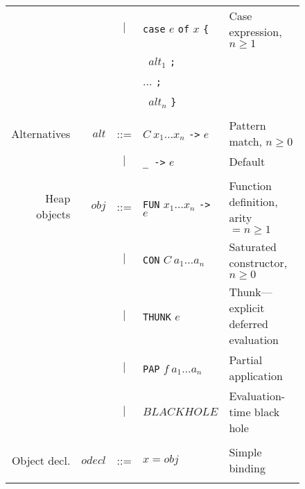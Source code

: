 \documentclass{llncs}
\begin{document}
\begin{figure}
\begin{tabular}{r r c l l}
             &                & $|$ & \texttt{case} $e$ \texttt{of} $x$ \texttt{\{}  & Case expression, $n \ge 1$\\
             &                &     & \texttt{ } $\mathit{alt}_1$ \texttt{;} \\
             &                &     & \hspace{0.2in} $\dots$ \texttt{;} \\
             &                &     & \texttt{ } $\mathit{alt}_n$ \texttt{\}} \\
\\
Alternatives & $\mathit{alt}$ & ::= & $C\ x_1\dots x_n$ \texttt{->} $e$            & Pattern match, $n \ge 0$ \\
             &                & $|$ & \texttt{\_ ->} $e$                           & Default \\
\\
Heap objects & $\mathit{obj}$ & ::= &\texttt{FUN} $x_1\dots x_n$ \texttt{->} $e$   & Function definition, arity $=n\ge 1$ \\
             &                & $|$ &\texttt{CON} $C\ a_1\dots a_n$                & Saturated constructor, $n \ge 0$ \\
             &                & $|$ &\texttt{THUNK} $e$                            & Thunk---explicit deferred evaluation \\
             &                & $|$ &\texttt{PAP} $f\ a_1\dots a_n$               & Partial application \\
             &                & $|$ & $\mathit{BLACKHOLE}$                         & Evaluation-time black hole \\
\\
Object decl. & $\mathit{odecl}$ & ::=  & $x = \mathit{obj}$                           & Simple binding \\
\\

\end{tabular}
\end{figure}
\end{document}
